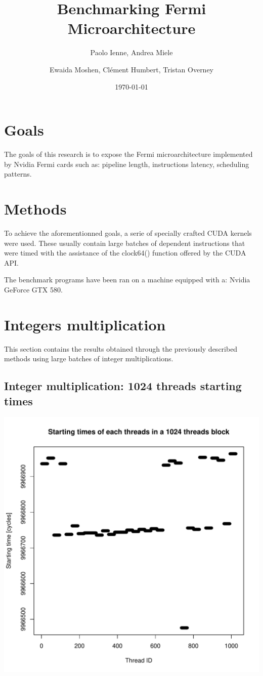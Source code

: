 \documentclass{article}
\begin{document}
\title{Benchmarking Fermi Microarchitecture}
\author{Paolo Ienne, Andrea Miele\and Ewaida Moshen, Cl\'{e}ment Humbert, Tristan Overney}
\date{\today}
\maketitle

\section{Goals}
	The goals of this research is to expose the Fermi microarchitecture implemented by
	Nvidia Fermi cards such as: pipeline length, instructions latency, scheduling
	patterns.

\section{Methods}
	To achieve the aforementionned goals, a serie of specially crafted CUDA kernels
	were used. These usually contain large batches of dependent instructions that were 
	timed with the assistance of the clock64() function offered by the CUDA API.

	The benchmark programs have been ran on a machine equipped with a: 
	Nvidia GeForce GTX 580.

\section{Integers multiplication}
	This section contains the results obtained through the previously described
	methods using large batches of integer multiplications.

	\subsection{Integer multiplication: 1024 threads starting times}
	\includegraphics[width=\linewidth]{"graphics/starting_times_ratio31"}
	\pagebreak
\end{document}
